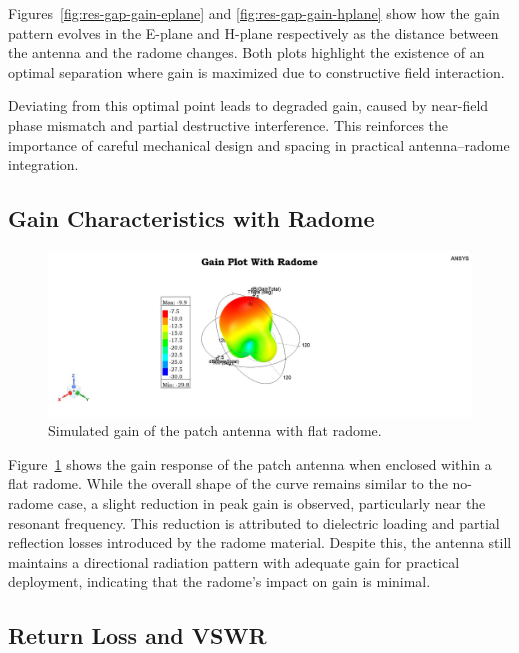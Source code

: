 Figures~\ref{fig:res-gap-gain-eplane} and \ref{fig:res-gap-gain-hplane} show how the gain pattern evolves in the E-plane and H-plane respectively as the distance between the antenna and the radome changes. Both plots highlight the existence of an optimal separation where gain is maximized due to constructive field interaction.

Deviating from this optimal point leads to degraded gain, caused by near-field phase mismatch and partial destructive interference. This reinforces the importance of careful mechanical design and spacing in practical antenna–radome integration.

\subsection{Gain Characteristics with Radome}

\begin{figure}[H]
    \centering
    \includegraphics[width=1.0\textwidth]{figures/with_radome/gain plot.jpeg}
    \caption{Simulated gain of the patch antenna with flat radome.}
    \label{fig:res-with-gain-radome}
\end{figure}

Figure~\ref{fig:res-with-gain-radome} shows the gain response of the patch antenna when enclosed within a flat radome. While the overall shape of the curve remains similar to the no-radome case, a slight reduction in peak gain is observed, particularly near the resonant frequency. This reduction is attributed to dielectric loading and partial reflection losses introduced by the radome material. Despite this, the antenna still maintains a directional radiation pattern with adequate gain for practical deployment, indicating that the radome's impact on gain is minimal.

\subsection{Return Loss and VSWR}

